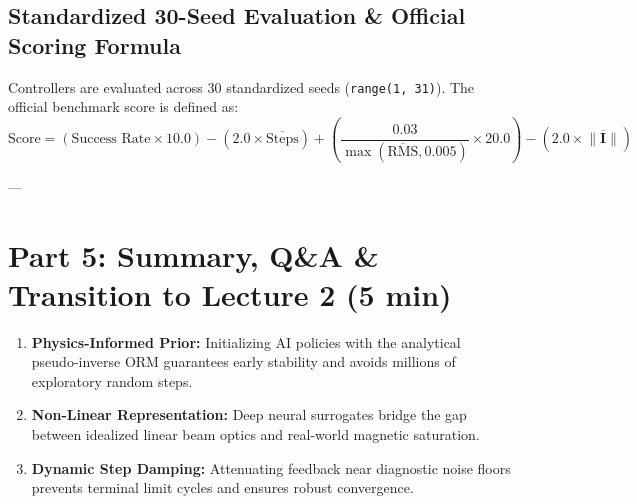 \documentclass[11pt,a4paper]{article}
\begin{document}
\subsection{Standardized 30-Seed Evaluation \& Official Scoring Formula}
Controllers are evaluated across 30 standardized seeds (\texttt{range(1, 31)}). The official benchmark score is defined as:
\begin{equation}
    \text{Score} = (\text{Success Rate} \times 10.0) - (2.0 \times \overline{\text{Steps}}) + \left(\frac{0.03}{\max(\overline{\text{RMS}}, 0.005)} \times 20.0\right) - (2.0 \times \overline{\|\mathbf{I}\|})
\end{equation}

\begin{table}[h!]
\centering
{}
\caption{Official benchmark results across 30 evaluation seeds.}
\label{tab:leaderboard}
\end{table}

---

\section{Part 5: Summary, Q\&A \& Transition to Lecture 2 (5 min)}

\begin{infobox}
\begin{enumerate}
    \item \textbf{Physics-Informed Prior:} Initializing AI policies with the analytical pseudo-inverse ORM guarantees early stability and avoids millions of exploratory random steps.
    \item \textbf{Non-Linear Representation:} Deep neural surrogates bridge the gap between idealized linear beam optics and real-world magnetic saturation.
    \item \textbf{Dynamic Step Damping:} Attenuating feedback near diagnostic noise floors prevents terminal limit cycles and ensures robust convergence.
\end{enumerate}
\end{infobox}
\end{document}
